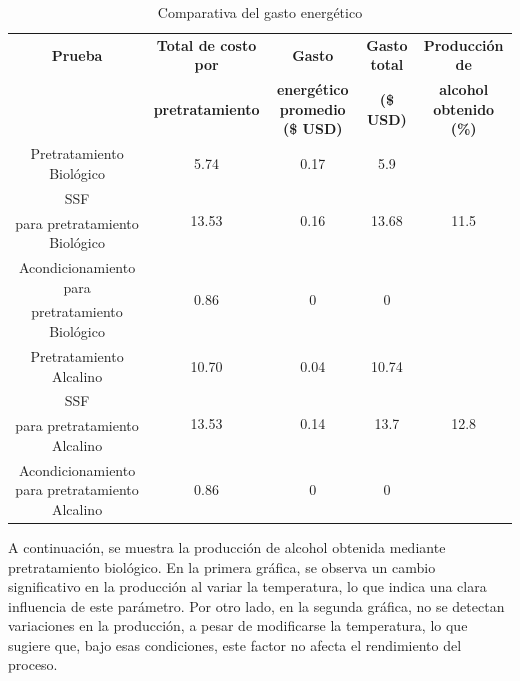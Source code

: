 \documentclass[12pt]{article}
\begin{document}
	
	\begin{table}[H]
		\centering
		\caption{Comparativa del gasto energético}
		\label{energi_2}
		\resizebox{16cm}{!} {
			\begin{tabular}{|c|c|c|c|c|}
				\hline
			\textbf{Prueba} & \textbf{Total de costo por} &\textbf{ Gasto}  & \textbf{Gasto total} & \textbf{Producción de} \\ 
				~ &  \textbf{pretratamiento} & \textbf{ energético promedio (\$ USD)} & \textbf{  (\$ USD)} &\textbf{  alcohol obtenido (\%)  }\\ \hline
				
				Pretratamiento Biológico & 5.74 & 0.17 & 5.9&   \\ \cline{1-4}
				SSF & \multirow{2}{*}{13.53}& \multirow{2}{*}{0.16} & \multirow{2}{*}{13.68}  & \multirow{2}{*}{11.5}  \\ 
				para pretratamiento Biológico & ~ & ~ & ~ &   \\ \cline{1-4}
			    Acondicionamiento para &  \multirow{2}{*}{0.86} & \multirow{2}{*}{0}&\multirow{2}{*}{0} &   \\ 
			     pretratamiento Biológico &  &&&   \\ \hline
				Pretratamiento Alcalino & 10.70 & 0.04 & 10.74&   \\ \cline{1-4}
				SSF  &  \multirow{2}{*}{13.53} & \multirow{2}{*}{0.14} & \multirow{2}{*}{13.7}& \multirow{2}{*}{12.8}  \\  
				para pretratamiento Alcalino & ~ & ~ & ~ &   \\ \cline{1-4}
				Acondicionamiento para pretratamiento Alcalino &0.86 & 0 & 0&   \\ \hline
		\end{tabular}	}
	\end{table}
	
	
	

	
			
		A continuación, se muestra la producción de alcohol obtenida mediante pretratamiento biológico. En la primera gráfica, se observa un cambio significativo en la producción al variar la temperatura, lo que indica una clara influencia de este parámetro. Por otro lado, en la segunda gráfica, no se detectan variaciones en la producción, a pesar de modificarse la temperatura, lo que sugiere que, bajo esas condiciones, este factor no afecta el rendimiento del proceso.
			
\end{document}
